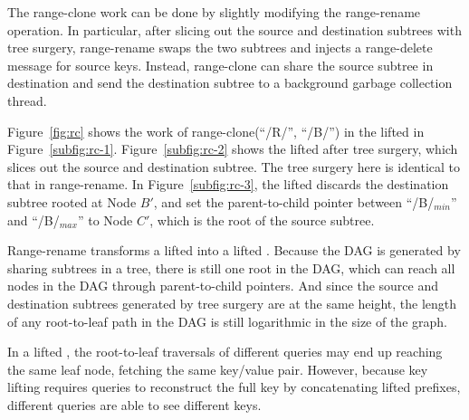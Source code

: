 The range-clone work can be done by slightly modifying the range-rename
operation.
In particular, after slicing out the source and destination subtrees with tree
surgery, range-rename swaps the two subtrees and injects a range-delete message
for source keys.
Instead, range-clone can share the source subtree in destination and send the
destination subtree to a background garbage collection thread.

Figure~\ref{fig:rc} shows the work of range-clone(``/R/'', ``/B/'') in the
lifted \bet in Figure~\ref{subfig:rc-1}.
Figure~\ref{subfig:rc-2} shows the lifted \bet after tree surgery, which slices
out the source and destination subtree.
The tree surgery here is identical to that in range-rename.
In Figure~\ref{subfig:rc-3}, the lifted \bet discards the destination subtree
rooted at Node $B'$, and set the parent-to-child pointer between ``/B/$_{min}$''
and ``/B/$_{max}$'' to Node $C'$, which is the root of the source subtree.

Range-rename transforms a lifted \bet into a lifted \bedag.
Because the DAG is generated by sharing subtrees in a tree,
there is still one root in the DAG,
which can reach all nodes in the DAG through parent-to-child pointers.
And since the source and destination subtrees generated by tree surgery are at
the same height, the length of any root-to-leaf path in the DAG is still
logarithmic in the size of the graph.

In a lifted \bedag, the root-to-leaf traversals of different queries may end up
reaching the same leaf node, fetching the same key/value pair.
However, because key lifting requires queries to reconstruct the full key by
concatenating lifted prefixes, different queries are able to see different keys.

